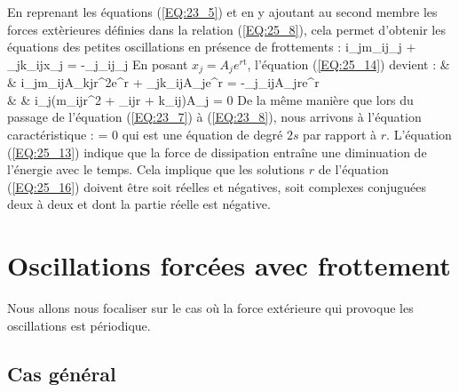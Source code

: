 En reprenant les \'{e}quations (\ref{EQ:23_5}) et en y ajoutant au second membre les forces ext\`{e}rieures d\'{e}finies dans la relation (\ref{EQ:25_8}), cela permet d'obtenir les \'{e}quations des petites oscillations en pr\'{e}sence de frottements :
\be
	\forall i\text{ }\sum_{j}m_{ij}_{j} + \sum_{j}k_{ij}x_{j} = -\sum_{j}\alpha_{ij}_{j} \label{EQ:25_14}
\ee
En posant $x_{j} = A_{j}e^{r\mathrm{t}}$, l'\'{e}quation (\ref{EQ:25_14}) devient :
\bea
	& & \forall i\text{ }\sum_{j}m_{ij}A_{kj}r^{2}e^{r} + \sum_{j}k_{ij}A_{j}e^{r} = -\sum_{j}\alpha_{ij}A_{j}re^{r} \nonumber \\
	& \Leftrightarrow & \forall i\text{ }\sum_{j}(m_{ij}r^{2} + \alpha_{ij}r + k_{ij})A_{j} = 0 \label{EQ:25_15}
\eea
De la m\^{e}me mani\`{e}re que lors du passage de l'\'{e}quation (\ref{EQ:23_7}) \`{a} (\ref{EQ:23_8}), nous arrivons \`{a} l'\'{e}quation caract\'{e}ristique :
\be
	 = 0 \label{EQ:25_16}
\ee
qui est une \'{e}quation de degr\'{e} $2s$ par rapport \`{a} $r$. L'\'{e}quation (\ref{EQ:25_13}) indique que la force de dissipation entra\^{i}ne une diminuation de l'\'{e}nergie avec le temps. Cela implique que les solutions $r$ de l'\'{e}quation (\ref{EQ:25_16}) doivent \^{e}tre soit r\'{e}elles et n\'{e}gatives, soit complexes conjugu\'{e}es deux \`{a} deux et dont la partie r\'{e}elle est n\'{e}gative.

\section{Oscillations forc\'{e}es avec frottement}\label{PAR:26}

Nous allons nous focaliser sur le cas o\`{u} la force ext\'{e}rieure qui provoque les oscillations est p\'{e}riodique.

\subsection{Cas g\'{e}n\'{e}ral}

